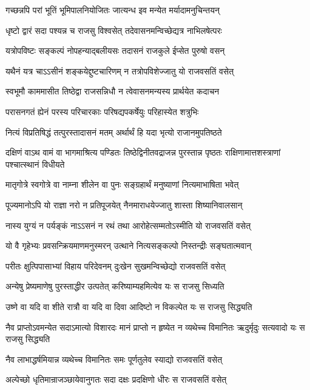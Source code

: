 \twolineshloka
{गच्छन्नपि परां भूतिं भूमिपालनियोजितः}
{जात्यन्ध इव मन्येत मर्यादामनुचिन्तयन्}


\twolineshloka
{धृष्टो द्वारं सदा पश्यन्न च राजसु विश्वसेत्}
{तदेवासनमन्विच्छेद्यत्र नाभिलषेत्परः}


\twolineshloka
{यत्रोपविष्टः सङ्कल्पं नोपहन्याद्बलीयसः}
{तदासनं राजकुले ईप्सेत पुरुषो वसन्}


\twolineshloka
{यथैनं यत्र चाऽऽसीनं शङ्कयेद्दुष्टचारिणम्}
{न तत्रोपविशेज्जातु यो राजवसतिं वसेत्}


\twolineshloka
{स्वभूमौ काममासीत तिष्ठेद्वा राजसन्निधौ}
{न त्वेवासनमन्यस्य प्रार्थयेत कदाचन}


\twolineshloka
{परासनगतं ह्येनं परस्य परिचारकाः}
{परिषद्यपकर्षेयुः परिहास्येत शत्रुभिः}


\twolineshloka
{नित्यं विप्रतिषिद्धं तत्पुरस्तादासनं मतम्}
{अर्थार्थं हि यदा भृत्यो राजानमुपतिष्ठते}


\threelineshloka
{दक्षिणं वाऽथ वामं वा भागमाश्रित्य पण्डितः}
{तिष्ठेद्विनीतवद्राजन्न पुरस्तान्न पृष्ठतः}
{राक्षिणामात्तशस्त्राणां पश्चात्स्थानं विधीयते}


\twolineshloka
{मातृगोत्रे स्वगोत्रे वा नाम्ना शीलेन वा पुनः}
{सङ्ग्रहार्थं मनुष्याणां नित्यमाभाषिता भवेत्}


\twolineshloka
{पूज्यमानोऽपि यो राज्ञा नरो न प्रतिपूजयेत्}
{नैनमाराधयेज्जातु शास्ता शिष्यानिवालसान्}


\twolineshloka
{नास्य युग्यं न पर्यङ्कं नाऽऽसनं न रथं तथा}
{आरोहेत्सम्मतोऽस्मीति यो राजवसतिं वसेत्}


\twolineshloka
{यो वै गृहेभ्यः प्रवसन्क्रियमाणमनुस्मरन्}
{उत्थाने नित्यसङ्कल्पो निस्तन्द्रीः सङ्घतात्मवान्}


\twolineshloka
{परीतः क्षुत्पिपासाभ्यां विहाय परिदेवनम्}
{दुःखेन सुखमन्विच्छेद्यो राजवसतिं वसेत्}


\twolineshloka
{अन्येषु प्रेष्यमाणेषु पुरस्ताद्धीर उत्पतेत्}
{करिष्याम्यहमित्येव यः स राजसु सिध्यति}


\twolineshloka
{उष्णे वा यदि वा शीते रात्रौ वा यदि वा दिवा}
{आदिष्टो न विकल्पेत यः स राजसु सिद्ध्यति}


\threelineshloka
{नैव प्राप्तोऽवमन्येत सदाऽमात्यो विशारदः}
{मानं प्राप्तो न हृष्येत न व्यथेच्च विमानितः}
{ऋदुर्मृदुः सत्यवादो यः स राजसु सिद्ध्यति}


\twolineshloka
{नैव लाभाद्धर्षमियान्न व्यथेच्च विमानितः}
{समः पूर्णतुलेव स्याद्यो राजवसतिं वसेत्}


\twolineshloka
{अल्पेच्छो धृतिमान्राजञ्छायेवानुगतः सदा}
{दक्षः प्रदक्षिणो धीरः स राजवसतिं वसेत्}


